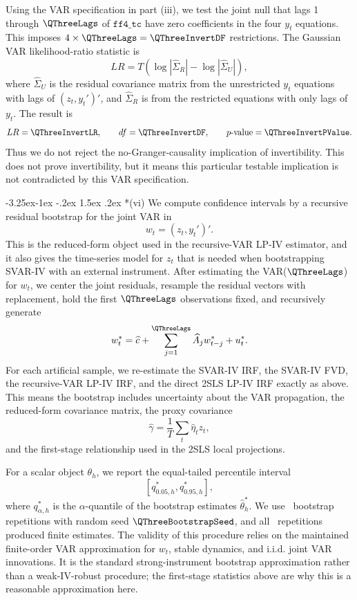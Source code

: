 \documentclass[11pt]{article}
\makeatletter
\renewcommand\subsection{\@startsection{subsection}{2}{\z@}%
  {-3.25ex\@plus -1ex \@minus -.2ex}%
  {1.5ex \@plus .2ex}%
  {\normalfont\large}}
\makeatother
\begin{document}
Using the VAR specification in part (iii), we test the joint null that lags 1 through
\(\QThreeLags\) of \(\texttt{ff4\_tc}\) have zero coefficients in the four \(y_t\) equations.
This imposes \(4\times \QThreeLags=\QThreeInvertDF\) restrictions. The Gaussian
VAR likelihood-ratio statistic is
\[
LR
=
T\left(\log|\widehat\Sigma_R|-\log|\widehat\Sigma_U|\right),
\]
where \(\widehat\Sigma_U\) is the residual covariance matrix from the unrestricted
\(y_t\) equations with lags of \((z_t,y_t')'\), and \(\widehat\Sigma_R\) is from the
restricted equations with only lags of \(y_t\). The result is
\[
LR=\QThreeInvertLR,
\qquad
df=\QThreeInvertDF,
\qquad
p\text{-value}=\QThreeInvertPValue.
\]
Thus we do not reject the no-Granger-causality implication of invertibility. This does not
prove invertibility, but it means this particular testable implication is not contradicted
by this VAR specification.

\subsection*{(vi)}
We compute confidence intervals by a recursive residual bootstrap for the joint VAR in
\[
w_t=(z_t,y_t')'.
\]
This is the reduced-form object used in the recursive-VAR LP-IV estimator, and it also
gives the time-series model for \(z_t\) that is needed when bootstrapping SVAR-IV with
an external instrument. After estimating the VAR(\(\QThreeLags\)) for \(w_t\), we center
the joint residuals, resample the residual vectors with replacement, hold the first
\(\QThreeLags\) observations fixed, and recursively generate
\[
w_t^*
=\widehat c+\sum_{j=1}^{\QThreeLags}\widehat A_j w_{t-j}^*+u_t^*.
\]
For each artificial sample, we re-estimate the SVAR-IV IRF, the SVAR-IV FVD, the
recursive-VAR LP-IV IRF, and the direct 2SLS LP-IV IRF exactly as above. This means the
bootstrap includes uncertainty about the VAR propagation, the reduced-form covariance
matrix, the proxy covariance
\[
\widehat{\gamma}=\frac{1}{T}\sum_t\widehat{\eta}_t z_t,
\]
and the first-stage relationship used in the 2SLS local projections.

For a scalar object \(\theta_h\), we report the equal-tailed percentile interval
\[
\left[
q_{0.05,h}^*,
q_{0.95,h}^*
\right],
\]
where \(q_{\alpha,h}^*\) is the \(\alpha\)-quantile of the bootstrap estimates
\(\widehat\theta_h^*\). We use \QThreeBootstrapReps\ bootstrap repetitions with random
seed \(\QThreeBootstrapSeed\), and all \QThreeBootstrapUsed\ repetitions produced finite
estimates. The validity of this procedure relies on the maintained finite-order VAR
approximation for \(w_t\), stable dynamics, and i.i.d. joint VAR innovations. It is the
standard strong-instrument bootstrap approximation rather than a weak-IV-robust
procedure; the first-stage statistics above are why this is a reasonable approximation
here.
\end{document}
